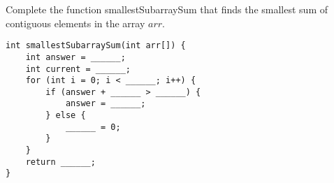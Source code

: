 \begin{blocksection}
\question Complete the function smallestSubarraySum that finds the smallest sum of contiguous elements in the array $arr$.

\begin{lstlisting}
int smallestSubarraySum(int arr[]) {
    int answer = ______;
    int current = ______;
    for (int i = 0; i < ______; i++) {
    	if (answer + ______ > ______) {
    		answer = ______;
        } else {
        	______ = 0;
        }
    }
    return ______;
}
\end{lstlisting}
\end{blocksection}